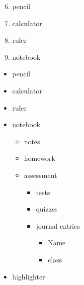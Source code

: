 \documentclass[11pt]{article}
\begin{document}
\begin{enumerate}\setcounter{enumi}{5}
\item pencil
\item calculator
\item ruler
\item notebook
\end{enumerate}

\pagebreak

\begin{itemize}
\item pencil
\item calculator
\item ruler
\item notebook
  \begin{itemize}
  \item notes
  \item homework
  \item assessment
  	\begin{itemize}
  	\item tests
  	\item quizzes
  	\item journal entries
  	\begin{itemize}
  	\item Name
  	\item class
  	\end{itemize}
  	\end{itemize}
  \end{itemize}
\item highlighter
\end{itemize}
\end{document}
